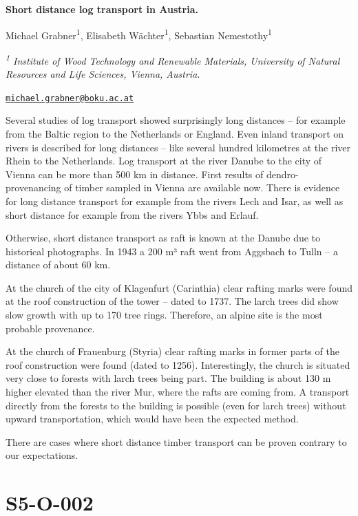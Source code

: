 \documentclass[
]{book}
\begin{document}
\textbf{Short distance log transport in Austria.}

Michael Grabner\textsuperscript{1}, Elisabeth Wächter\textsuperscript{1}, Sebastian Nemestothy\textsuperscript{1}

\emph{\textsuperscript{1} Institute of Wood Technology and Renewable Materials, University of Natural Resources and Life Sciences, Vienna, Austria.}

\href{mailto:michael.grabner@boku.ac.at}{\nolinkurl{michael.grabner@boku.ac.at}}

Several studies of log transport showed surprisingly long distances -- for example from the Baltic region to the Netherlands or England. Even inland transport on rivers is described for long distances -- like several hundred kilometres at the river Rhein to the Netherlands. Log transport at the river Danube to the city of Vienna can be more than 500 km in distance. First results of dendro-provenancing of timber sampled in Vienna are available now. There is evidence for long distance transport for example from the rivers Lech and Isar, as well as short distance for example from the rivers Ybbs and Erlauf.

Otherwise, short distance transport as raft is known at the Danube due to historical photographs. In 1943 a 200 m³ raft went from Aggsbach to Tulln -- a distance of about 60 km.

At the church of the city of Klagenfurt (Carinthia) clear rafting marks were found at the roof construction of the tower -- dated to 1737. The larch trees did show slow growth with up to 170 tree rings. Therefore, an alpine site is the most probable provenance.

At the church of Frauenburg (Styria) clear rafting marks in former parts of the roof construction were found (dated to 1256). Interestingly, the church is situated very close to forests with larch trees being part. The building is about 130 m higher elevated than the river Mur, where the rafts are coming from. A transport directly from the forests to the building is possible (even for larch trees) without upward transportation, which would have been the expected method.

There are cases where short distance timber transport can be proven contrary to our expectations.

\hypertarget{s5-o-002}{%
\section*{S5-O-002}\label{s5-o-002}}
\end{document}
